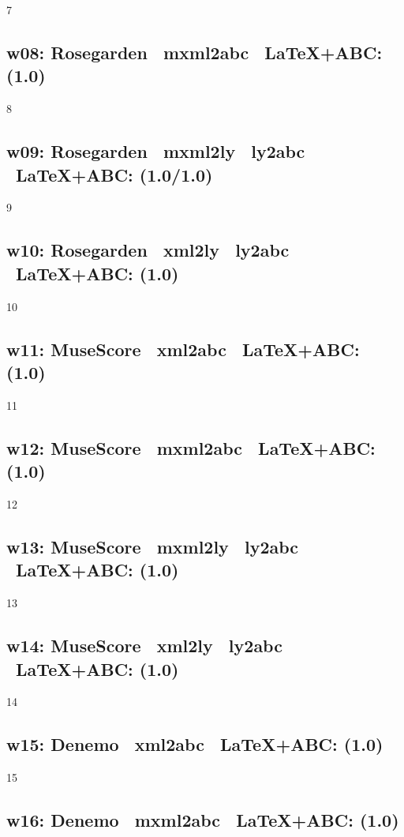 7

\subsection{w08: Rose\-garden \ra\ mxml2abc \ra\ \LaTeX+ABC: (1.0)} 

8

\subsection{w09: Rose\-garden \ra\ mxml2ly \ra\ ly2abc \ra\ \LaTeX+ABC: (1.0/1.0)} 

9

\subsection{w10: Rose\-garden \ra\ xml2ly \ra\ ly2abc \ra\ \LaTeX+ABC: (1.0)} 

10

\subsection{w11: Muse\-Score \ra\ xml2abc \ra\ \LaTeX+ABC: (1.0)} 

11

\subsection{w12: Muse\-Score \ra\ mxml2abc \ra\ \LaTeX+ABC: (1.0)}

12

\subsection{w13: Muse\-Score \ra\ mxml2ly \ra\ ly2abc \ra\ \LaTeX+ABC: (1.0)} 

13

\subsection{w14: Muse\-Score \ra\ xml2ly \ra\ ly2abc \ra\ \LaTeX+ABC: (1.0)}

14

\subsection{w15: Denemo \ra\ xml2abc \ra\ \LaTeX+ABC: (1.0)}

15

\subsection{w16: Denemo \ra\ mxml2abc \ra\ \LaTeX+ABC: (1.0)} 

